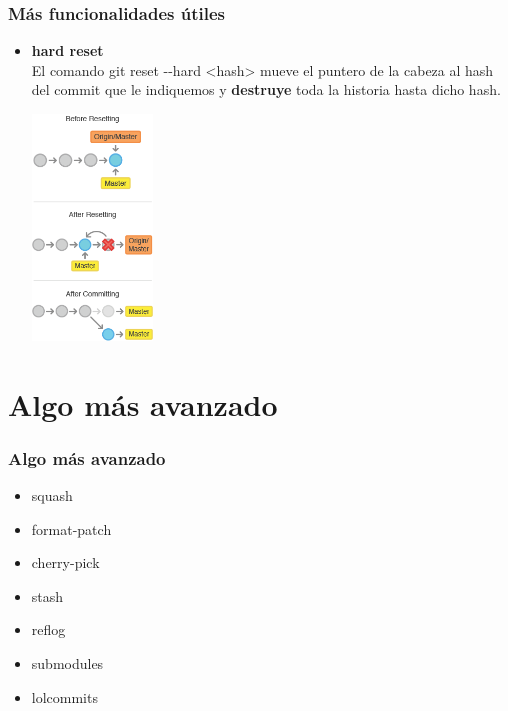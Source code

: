 \frame
{
\frametitle{Más funcionalidades útiles}
\begin{itemize}
 \item \textbf{hard reset}\\ \indent
 El comando git reset -{}-hard <hash> mueve el puntero de la cabeza al hash del commit que le indiquemos y \textbf{destruye} toda la historia hasta dicho hash.\\
 \begin{center}
    \includegraphics[height=6cm]{imgs/reset-hard.png}
 \end{center}
\end{itemize}
}

\section{Algo más avanzado}
\frame
{
\frametitle{Algo más avanzado}
\begin{itemize}
 \item squash
 \item format-patch
 \item cherry-pick
 \item stash
 \item reflog 
 \item submodules
 \item lolcommits 
\end{itemize}
}
